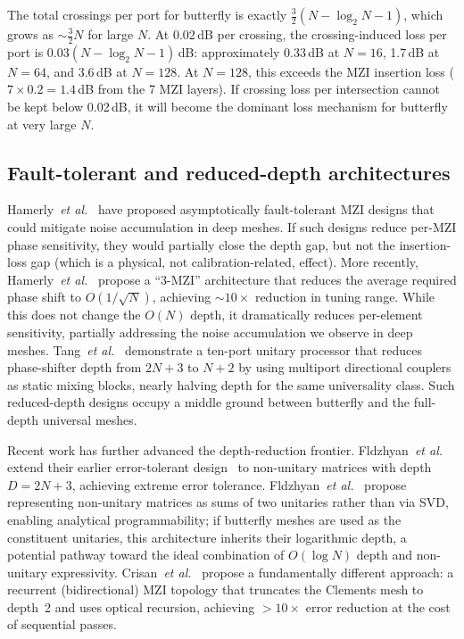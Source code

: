 \documentclass[11pt,a4paper]{article}
\begin{document}
The total crossings per port for butterfly is exactly $\frac{3}{2}(N - \log_2 N - 1)$,
which grows as ${\sim}\frac{3}{2}N$ for large $N$.  At 0.02\,dB per crossing, the
crossing-induced loss per port is $0.03(N - \log_2 N - 1)$\,dB: approximately 0.33\,dB
at $N{=}16$, 1.7\,dB at $N{=}64$, and 3.6\,dB at $N{=}128$.  At $N{=}128$, this
exceeds the MZI insertion loss ($7 \times 0.2 = 1.4$\,dB from the 7 MZI layers).
If crossing loss per intersection cannot be kept below 0.02\,dB, it will become the
dominant loss mechanism for butterfly at very large $N$.

\subsection{Fault-tolerant and reduced-depth architectures}

Hamerly~\textit{et al.}~\cite{hamerly2022nat} have proposed asymptotically
fault-tolerant MZI designs that could mitigate noise accumulation in deep meshes.
If such designs reduce per-MZI phase sensitivity, they would partially close the
depth gap, but not the insertion-loss gap (which is a physical, not
calibration-related, effect).
More recently, Hamerly~\textit{et al.}~\cite{hamerly2025} propose a ``3-MZI''
architecture that reduces the average required phase shift to $O(1/\sqrt{N})$,
achieving ${\sim}10\times$ reduction in tuning range.  While this does not
change the $O(N)$ depth, it dramatically reduces per-element sensitivity,
partially addressing the noise accumulation we observe in deep meshes.
Tang~\textit{et al.}~\cite{tang2024} demonstrate a ten-port unitary processor
that reduces phase-shifter depth from $2N{+}3$ to $N{+}2$ by using multiport
directional couplers as static mixing blocks, nearly halving depth for the same
universality class.  Such reduced-depth designs occupy a middle ground between
butterfly and the full-depth universal meshes.

Recent work has further advanced the depth-reduction frontier.
Fldzhyan~\textit{et al.}~\cite{fldzhyan2024} extend their earlier
error-tolerant design~\cite{fldzhyan2020} to non-unitary matrices with depth
$D = 2N{+}3$, achieving extreme error tolerance.
Fldzhyan~\textit{et al.}~\cite{fldzhyan2026} propose representing non-unitary
matrices as sums of two unitaries rather than via SVD, enabling analytical
programmability; if butterfly meshes are used as the constituent unitaries, this
architecture inherits their logarithmic depth, a potential pathway toward the
ideal combination of $O(\log N)$ depth and non-unitary expressivity.
Crisan~\textit{et al.}~\cite{crisan2025} propose a fundamentally different
approach: a recurrent (bidirectional) MZI topology that truncates the Clements
mesh to depth~2 and uses optical recursion, achieving ${>}10\times$ error
reduction at the cost of sequential passes.
\end{document}
